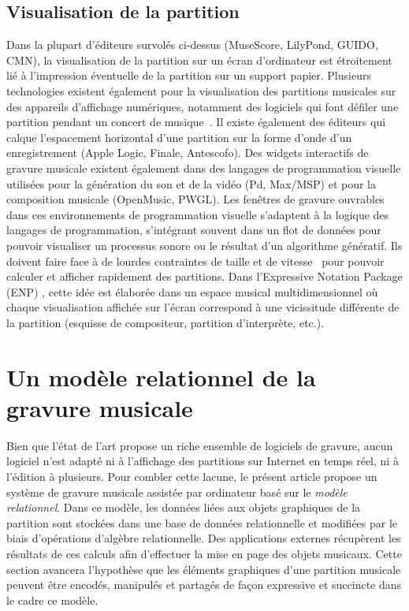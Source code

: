 \documentclass{article}
\begin{document}
\subsection{Visualisation de la partition}
Dans la plupart d'éditeurs survolés ci-dessus (MuseScore, LilyPond, GUIDO,
CMN), la visualisation de la partition sur un écran d'ordinateur est
étroitement lié à l'impression éventuelle de la partition sur un support
papier. Plusieurs technologies existent également pour la visualisation
des partitions musicales sur des appareils d'affichage numériques, notamment
des logiciels qui font défiler une partition pendant un concert de musique~\cite{fitzpatrick1998networked}\-\cite{qian2002portable}\-\cite{egyud1998hand}.
Il existe également des éditeurs qui calque l'espacement horizontal d'une
partition sur la forme d'onde d'un enregistrement (Apple Logic, Finale, Antescofo).
Des widgets interactifs de gravure musicale existent également dans des langages de
programmation visuelle utilisées pour la génération du son et de la vidéo (Pd,
Max/MSP) et pour la composition musicale (OpenMusic, PWGL).
Les fenêtres de gravure ouvrables dans ces environnements de programmation
visuelle s'adaptent à la logique
des langages de programmation, s'intégrant souvent dans un flot de données pour
pouvoir visualiser un processus sonore ou le résultat d'un algorithme
génératif. Ils doivent faire face à de lourdes contraintes de taille et de
vitesse~\cite{kelly2011gemnotes}
pour pouvoir calculer et afficher rapidement des partitions. 
Dans l'Expressive Notation Package (ENP)
\cite{kuuskankare2006expressive}, cette idée est élaborée dans un espace
musical multidimensionnel où chaque visualisation affichée sur l'écran correspond à
une vicissitude différente de la partition (esquisse de compositeur, partition d'interprète, etc.).

\section{Un modèle relationnel de la gravure musicale}
Bien que l'état de l'art propose un riche ensemble de logiciels de gravure,
aucun logiciel n'est adapté ni à l'affichage des partitions sur Internet en
temps réel, ni à l'édition à plusieurs. Pour combler cette
lacune, le présent article propose un système de gravure musicale assistée par
ordinateur basé sur le
\emph{modèle relationnel}.
Dans ce modèle, les données liées aux objets graphiques de la partition sont
stockées dans une base de données relationnelle et modifiées par le biais
d'opérations d'algèbre relationnelle. Des applications externes récupèrent
les résultats de ces calculs afin d'effectuer la mise en page des objets
musicaux.
Cette section avancera l'hypothèse que les éléments graphiques d'une partition
musicale peuvent être encodés, manipulés et partagés de façon expressive et
succincte dans le cadre ce modèle.\par
\end{document}
